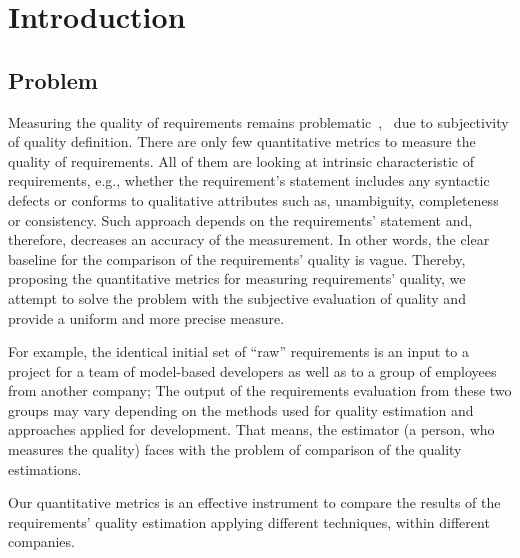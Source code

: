 \section{Introduction}
\label{sec:Intro} 

\subsection{Problem}
Measuring the quality of requirements remains problematic~\cite{Fernandez2016},~\cite{Mund:2017} 
due to subjectivity of quality definition. There are only few quantitative metrics to measure the quality of requirements. 
All of them are looking at intrinsic characteristic of requirements, e.g., whether the requirement’s statement 
includes any syntactic defects or conforms to qualitative attributes such as, unambiguity, completeness or consistency. 
Such approach depends on the requirements' statement and, therefore, decreases an accuracy of the measurement. 
In other words, the clear baseline for the comparison of the requirements' quality is vague. 
Thereby, proposing the quantitative metrics for measuring requirements' quality, we attempt 
to solve the problem with the subjective evaluation of quality and provide a uniform and more precise measure. 
 
For example, the identical initial set of ``raw'' requirements is an input to a project for a team of model-based developers as well as to a group of employees from another company;%
The output of the requirements evaluation from these two groups may vary depending on the methods used for quality estimation and approaches applied for development. That means, the estimator (a person, who measures the quality) faces with the problem of comparison of the quality estimations.  

Our quantitative metrics is an effective instrument to compare the results of the requirements' quality estimation applying different techniques, within different companies.


